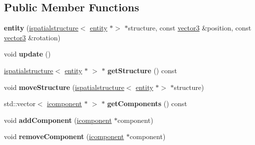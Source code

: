 \subsection*{Public Member Functions}
\begin{DoxyCompactItemize}
\item 
\mbox{\label{classflounder_1_1entity_ab5e894ac7f8af499b80435feaaf04e7e}} 
{\bfseries entity} (\hyperlink{classflounder_1_1ispatialstructure}{ispatialstructure}$<$ \hyperlink{classflounder_1_1entity}{entity} $\ast$$>$ $\ast$structure, const \hyperlink{classflounder_1_1vector3}{vector3} \&position, const \hyperlink{classflounder_1_1vector3}{vector3} \&rotation)
\item 
\mbox{\label{classflounder_1_1entity_a564006c147b9f045e859855fcf40eeb2}} 
void {\bfseries update} ()
\item 
\mbox{\label{classflounder_1_1entity_a3e91898605312543c7d7620c6dc2421c}} 
\hyperlink{classflounder_1_1ispatialstructure}{ispatialstructure}$<$ \hyperlink{classflounder_1_1entity}{entity} $\ast$ $>$ $\ast$ {\bfseries get\+Structure} () const
\item 
\mbox{\label{classflounder_1_1entity_ab0bc93832ee10ebec9b348ed8584e4aa}} 
void {\bfseries move\+Structure} (\hyperlink{classflounder_1_1ispatialstructure}{ispatialstructure}$<$ \hyperlink{classflounder_1_1entity}{entity} $\ast$$>$ $\ast$structure)
\item 
\mbox{\label{classflounder_1_1entity_ab69b6b662d793755b530bb104a8c3bdb}} 
std\+::vector$<$ \hyperlink{classflounder_1_1icomponent}{icomponent} $\ast$ $>$ $\ast$ {\bfseries get\+Components} () const
\item 
\mbox{\label{classflounder_1_1entity_ab156e98ffc4df6fb39e53c7c89aa3b68}} 
void {\bfseries add\+Component} (\hyperlink{classflounder_1_1icomponent}{icomponent} $\ast$component)
\item 
\mbox{\label{classflounder_1_1entity_a5a50d7de50e101cef703134bc1dc8e07}} 
void {\bfseries remove\+Component} (\hyperlink{classflounder_1_1icomponent}{icomponent} $\ast$component)
\item 

\end{DoxyCompactItemize}
